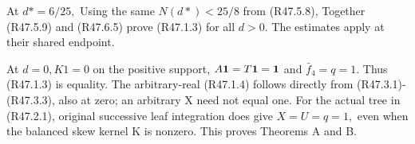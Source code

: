 At \(d*=6/25,\allowbreak \)
Using the same \(N(d*)<25/8\) from (R47.5.8),
Together (R47.5.9) and (R47.6.5) prove (R47.1.3) for all \(d>0.\) The estimates apply at their shared endpoint.

At \(d=0,\allowbreak  K1=0\) on the positive support, \(A\mathbf1=T\mathbf1=\mathbf1\) and \(\bar f_4=q=1.\)
Thus (R47.1.3) is equality. The arbitrary-real (R47.1.4) follows directly from
(R47.3.1)-(R47.3.3), also at zero; an arbitrary X need not equal one.
For the actual tree in (R47.2.1), original successive leaf integration does
give \(X=U=q=1,\allowbreak \) even when the balanced skew kernel K is nonzero.
This proves Theorems A and B.
